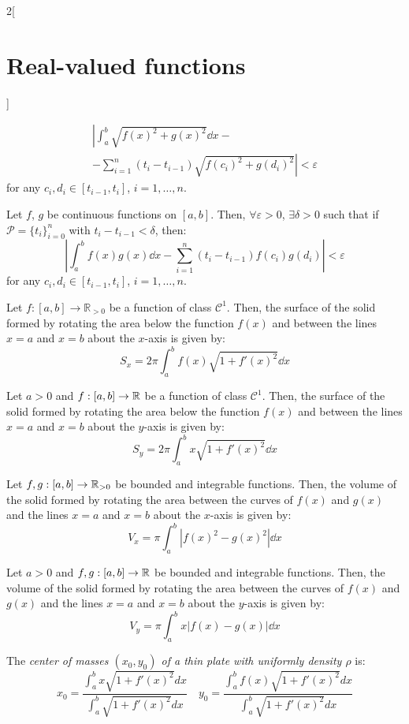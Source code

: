 \documentclass[../../../main.tex]{subfiles}
\begin{document}
\begin{multicols}{2}[\section{Real-valued functions}]
\begin{lemma}
        \begin{multline*}
            \left|\int_a^b\sqrt{{f(x)}^2+{g(x)}^2}\dd x\right.-\\-\left.\sum_{i=1}^n(t_i-t_{i-1})\sqrt{{f(c_i)}^2+{g(d_i)}^2}\right|<\varepsilon
        \end{multline*}
        for any $c_i,d_i\in[t_{i-1},t_i]$, $i=1,\ldots,n$.
    \end{lemma}
    \begin{lemma}
        Let $f$, $g$ be continuous functions on $[a,b]$. Then, $\forall\varepsilon>0$, $\exists\delta>0$ such that if $\mathcal{P}=\{t_i\}_{i=0}^n$ with $t_i-t_{i-1}<\delta$, then:
        $$\left|\int_a^bf(x)g(x)\dd x-\sum_{i=1}^n(t_i-t_{i-1})f(c_i)g(d_i)\right|<\varepsilon$$
        for any $c_i,d_i\in[t_{i-1},t_i]$, $i=1,\ldots,n$.
    \end{lemma}
    \begin{prop}
        Let $f:[a,b]\rightarrow\mathbb{R}_{>0}$ be a function of class $\mathcal{C}^1$. Then, the surface of the solid formed by rotating the area below the function $f(x)$ and between the lines $x = a$ and $x = b$ about the $x$-axis is given by: $$S_x=2\pi\int_a^bf(x)\sqrt{1+{f'(x)}^2}\dd x$$
    \end{prop}
    \begin{prop}
        Let $a>0$ and $f:[a,b]\rightarrow\mathbb{R}$ be a function of class $\mathcal{C}^1$. Then, the surface of the solid formed by rotating the area below the function $f(x)$ and between the lines $x = a$ and $x = b$ about the $y$-axis is given by: $$S_y=2\pi\int_a^bx\sqrt{1+{f'(x)}^2}\dd x$$
    \end{prop}
    \begin{prop}
        Let $f,g:[a,b]\rightarrow\mathbb{R}_{>0}$ be bounded and integrable functions. Then, the volume of the solid formed by rotating the area between the curves of $f(x)$ and $g(x)$ and the lines $x = a$ and $x = b$ about the $x$-axis is given by: $$V_x=\pi\int_a^b\left|{f(x)}^2-{g(x)}^2\right|\dd x$$
    \end{prop}
    \begin{prop}
        Let $a>0$ and $f,g:[a,b]\rightarrow\mathbb{R}$ be bounded and integrable functions. Then, the volume of the solid formed by rotating the area between the curves of $f(x)$ and $g(x)$ and the lines $x = a$ and $x = b$ about the $y$-axis is given by: $$V_y=\pi\int_a^bx\left|f(x)-g(x)\right|\dd x$$
    \end{prop}
    \begin{prop}
        The \textit{center of masses $(x_0,y_0)$ of a thin plate with uniformly density $\rho$} is: $$x_0=\frac{\displaystyle\int_a^bx\sqrt{1+{f'(x)}^2}dx}{\displaystyle\int_a^b\sqrt{1+{f'(x)}^2}dx}\quad y_0=\frac{\displaystyle\int_a^b f(x)\sqrt{1+{f'(x)}^2}dx}{\displaystyle\int_a^b\sqrt{1+{f'(x)}^2}dx}$$
    \end{prop}

\end{multicols}
\end{document}
